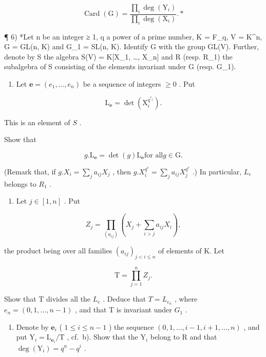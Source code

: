 \[
\operatorname{Card} (\mathrm{G}) = \frac {\prod_ {i} \deg \left(\mathrm{Y} _ {i}\right)}{\prod_ {i} \deg \left(\mathrm{X} _ {i}\right)}. *
\]

¶ 6) *Let n be an integer ≥ 1, q a power of a prime number, K = F\_q, V = K\^{}n, G = GL(n, K) and G\_1 = SL(n, K). Identify G with the group GL(V). Further, denote by S the algebra S(V) = K{[}X\_1, \ldots, X\_n{]} and R (resp. R\_1) the subalgebra of S consisting of the elements invariant under G (resp. G\_1).

\begin{enumerate}
\def\labelenumi{\alph{enumi})}
\tightlist
\item
  Let \(\mathbf{e} = (e_1, \ldots, e_n)\) be a sequence of integers \(\geqslant 0\) . Put
\end{enumerate}

\[
\mathrm{L} _ {\mathbf {e}} = \det (\mathrm{X} _ {i} ^ {q ^ {e _ {j}}}).
\]

This is an element of \(S\) .

Show that

\[
g. \mathrm{L} _ {\mathbf {e}} = \det (g) \mathrm{L} _ {\mathbf {e}} \text {for all} g \in \mathrm{G}.
\]

(Remark that, if \(g.X_i = \sum_j a_{ij} X_j\) , then \(g.X_i^{q^e} = \sum_j a_{ij} X_j^{q^e}\) .) In particular, \(L_e\) belongs to \(R_1\) .

\begin{enumerate}
\def\labelenumi{\alph{enumi})}
\setcounter{enumi}{1}
\tightlist
\item
  Let \(j \in [1, n]\) . Put
\end{enumerate}

\[
Z _ {j} = \prod_ {(a _ {i j})} (X _ {j} + \sum_ {i > j} a _ {i j} X _ {i}),
\]

the product being over all families \((a_{ij})_{j < i\leqslant n}\) of elements of K. Let

\[
\mathrm{T} = \prod_ {j = 1} ^ {n} Z _ {j}.
\]

Show that T divides all the \(L_{e}\) . Deduce that \(T = L_{e_{n}}\) , where \(e_{n} = (0, 1, \ldots, n - 1)\) , and that T is invariant under \(G_{1}\) .

\begin{enumerate}
\def\labelenumi{\alph{enumi})}
\setcounter{enumi}{2}
\tightlist
\item
  Denote by \(\mathbf{e}_i\) ( \(1 \leqslant i \leqslant n - 1\) ) the sequence \((0, 1, \ldots, i - 1, i + 1, \ldots, n)\) , and put \(\mathrm{Y}_i = \mathrm{L}_{\mathbf{e}_i} / \mathrm{T}\) , cf.~b). Show that the \(\mathrm{Y}_i\) belong to R and that \(\deg(\mathrm{Y}_i) = q^n - q^i\) .
\end{enumerate}

